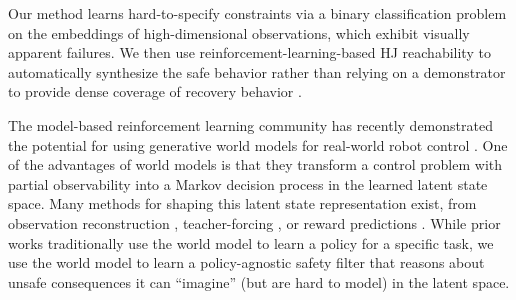 Our method learns hard-to-specify constraints via a binary classification problem on the embeddings of high-dimensional observations, which exhibit visually apparent failures. 
We then use reinforcement-learning-based HJ reachability to automatically synthesize the safe behavior rather than relying on a demonstrator to provide dense coverage of recovery behavior \cite{lindemann2024learning, robey2020learning}.



The model-based reinforcement learning community has recently demonstrated the potential for using generative world models for real-world robot control \cite{mendonca2023structured, wu2022daydreamer}. 
One of the advantages of world models is that they transform a control problem with partial observability into a Markov decision process in the learned latent state space.
Many methods for shaping this latent state representation exist, from observation reconstruction \cite{hafner2019learning, hafner2020dreamerv2, hafner2024masteringdiversedomainsworld}, teacher-forcing \cite{zhou2024dinowm}, or reward predictions \cite{Hansen2022tdmpc, hansen2024tdmpc2}. 
While prior works traditionally use the world model to learn a policy for a specific task, we use the world model to learn a policy-agnostic safety filter that reasons about unsafe consequences it can ``imagine'' (but are hard to model) in the latent space.

